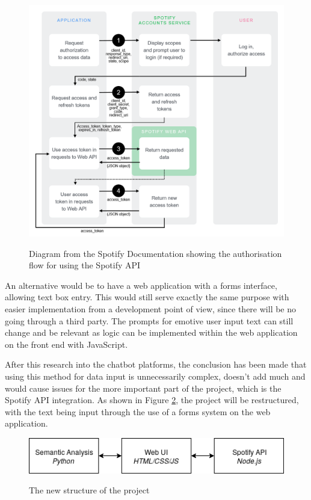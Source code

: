 \begin{figure}[ht]
\caption{Diagram from the Spotify Documentation showing the authorisation flow for using the Spotify API \cite{spotifyHello}}
\centering
\includegraphics[scale=0.3]{./LitReview/images/spotifyAuthGuide.png}
\label{spotify:auth}
\end{figure}

An alternative would be to have a web application with a forms interface, allowing text box entry. This would still serve exactly the same purpose with easier implementation from a development point of view, since there will be no going through a third party. 
The prompts for emotive user input text can still change and be relevant as logic can be implemented within the web application on the front end with JavaScript. 

After this research into the chatbot platforms, the conclusion has been made that using this method for data input is unnecessarily complex, doesn't add much and would cause issues for the more important part of the project, which is the Spotify API integration. As shown in Figure \ref{programFlow}, the project will be restructured, with the text being input through the use of a forms system on the web application.

\begin{figure}[h]
\caption{The new structure of the project}
\centering
\includegraphics[scale=0.5]{./LitReview/images/ProgramFlow.png}
\label{programFlow}
\end{figure}